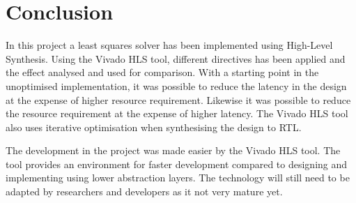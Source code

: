 \chapter{Conclusion}
In this project a least squares solver has been implemented using High-Level Synthesis. Using the Vivado HLS tool, different directives has been applied and the effect analysed and used for comparison. With a starting point in the unoptimised implementation, it was possible to reduce the latency in the design at the expense of higher resource requirement. Likewise it was possible to reduce the resource requirement at the expense of higher latency. The Vivado HLS tool also uses iterative optimisation when synthesising the design to RTL.

The development in the project was made easier by the Vivado HLS tool. The tool provides an environment for faster development compared to designing and implementing using lower abstraction layers. The technology will still need to be adapted by researchers and developers as it not very mature yet.